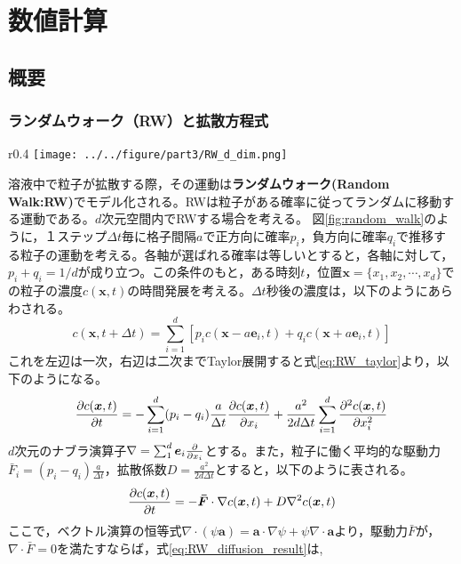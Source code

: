 \documentclass[autodetect-engine,dvi=dvipdfmx,a4paper,ja=standard,oneside,openany,11pt,draft,textwidth=50zw]{bxjsbook}
\begin{document}
\chapter{数値計算}
\section{概要}
\subsection{ランダムウォーク（RW）と拡散方程式}
\label{sec:RW}
\begin{wrapfigure}{r}{0.4\textwidth}
  \centering
  \texttt{[image: ../../figure/part3/RW\_d\_dim.png]}
  \caption{ランダムウォークの模式図}
  \label{fig:random_walk}
\end{wrapfigure}
溶液中で粒子が拡散する際，その運動は\textbf{ランダムウォーク(Random Walk:RW)}でモデル化される。RWは粒子がある確率に従ってランダムに移動する運動である。$d$次元空間内でRWする場合を考える。
図\ref{fig:random_walk}のように，１ステップ$\Delta t$毎に格子間隔$a$で正方向に確率$p_i$，負方向に確率$q_i$で推移する粒子の運動を考える。各軸が選ばれる確率は等しいとすると，各軸に対して，$p_i+q_i=1/d$が成り立つ。この条件のもと，ある時刻$t$，位置$\bm{x}=\{x_1,x_2,\cdots,x_d\}$での粒子の濃度$c(\bm{x},t)$の時間発展を考える。$\Delta t$秒後の濃度は，以下のようにあらわされる。
\begin{equation}
  c(\bm{x},t+\Delta t)=\sum_{i=1}^{d}\left[p_i c(\bm{x}-a\bm{e}_i,t)+q_i c(\bm{x}+a\bm{e}_i,t)\right]
  \label{eq:RW}
\end{equation}
これを左辺は一次，右辺は二次までTaylor展開すると式\ref{eq:RW_taylor}より，以下のようになる。
\begin{equation}
  \pdv{c(\bm{x},t)}{t}=-\sum_{i=1}^{d}(p_i-q_i)\frac{a}{\Delta t}\pdv{c(\bm{x},t)}{x_i}+\frac{a^2}{2d\Delta t}\sum_{i=1}^{d}\pdv[2]{c(\bm{x},t)}{x_i}
  \label{eq:RW_diffusion}
\end{equation}
$d$次元のナブラ演算子$\nabla=\sum_{1}^{d}\bm{e}_i\pdv*{}{x_i}$とする。また，粒子に働く平均的な駆動力$\bar{F}_i=(p_i-q_i)\frac{a}{\Delta t}$，拡散係数$D=\frac{a^2}{2d\Delta t}$とすると，以下のように表される。
\begin{equation}
  \pdv{c(\bm{x},t)}{t}=-\bm{\bar{F}}\cdot\nabla c(\bm{x},t)+D\nabla^2 c(\bm{x},t)
  \label{eq:RW_diffusion_result}
\end{equation}
ここで，ベクトル演算の恒等式$\nabla\cdot(\psi\bm{a})=\bm{a}\cdot\nabla\psi+\psi\nabla\cdot\bm{a}$より，駆動力$\bar{F}$が，$\nabla\cdot\bar{F}=0$を満たすならば，式\ref{eq:RW_diffusion_result}は,
\end{document}
